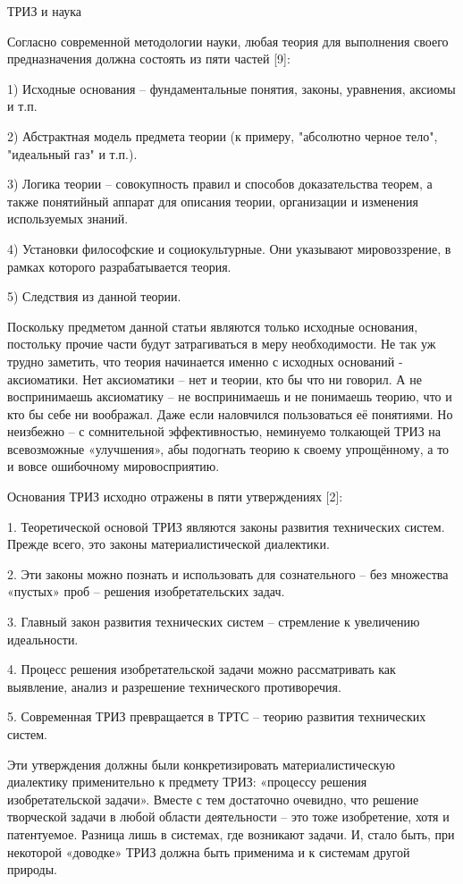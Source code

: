 \documentclass[11pt,a4paper]{article}
\begin{document}
 

 

ТРИЗ и наука

 

Согласно современной методологии науки, любая теория для выполнения своего предназначения должна состоять из пяти частей [9]:

1) Исходные основания – фундаментальные понятия, законы, уравнения, аксиомы и т.п.

2) Абстрактная модель предмета теории (к примеру, "абсолютно черное тело", "идеальный газ" и т.п.).

3) Логика теории – совокупность правил и способов доказательства теорем, а также понятийный аппарат для описания теории, организации и изменения используемых знаний.

4) Установки философские и социокультурные. Они указывают мировоззрение, в рамках которого разрабатывается теория.

5) Следствия из данной теории.

 

Поскольку предметом данной статьи являются только исходные основания, постольку прочие части будут затрагиваться в меру необходимости. Не так уж трудно заметить, что теория начинается именно с исходных оснований - аксиоматики. Нет аксиоматики – нет и теории, кто бы что ни говорил. А не воспринимаешь аксиоматику – не воспринимаешь и не понимаешь теорию, что и кто бы себе ни воображал. Даже если наловчился пользоваться её понятиями. Но неизбежно – с сомнительной эффективностью, неминуемо толкающей ТРИЗ на всевозможные «улучшения», абы подогнать теорию к своему упрощённому, а то и вовсе ошибочному мировосприятию.

Основания ТРИЗ исходно отражены в пяти утверждениях [2]:

1. Теоретической основой ТРИЗ являются законы развития технических систем. Прежде всего, это законы материалистической диалекти­ки.

2. Эти законы можно познать и использовать для сознательного – без множества «пустых» проб – решения изобретательских задач.

3. Главный закон развития технических систем – стремление к увеличению идеальности.

4. Процесс решения изобретательской задачи можно рассматривать как выявление, анализ и разрешение технического противоречия.

5. Современная ТРИЗ превращается в ТРТС – теорию развития технических систем.

 Эти утверждения должны были конкретизировать материалистическую диалектику применительно к предмету ТРИЗ: «процессу решения изобретательской задачи». Вместе с тем достаточно очевидно, что решение творческой задачи в любой области деятельности – это тоже изобретение, хотя и патентуемое. Разница лишь в системах, где возникают задачи. И, стало быть, при некоторой «доводке» ТРИЗ должна быть применима и к системам другой природы.
\end{document}
